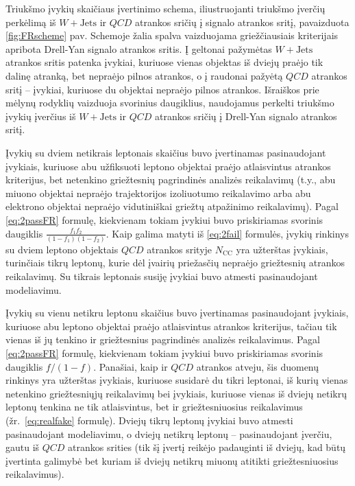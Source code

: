 \documentclass[a4paper, 12pt, oneside]{article}
\newcommand{\WJets}{W\! +\!\mathrm{Jets}}
\newcommand{\QCD}{QC\! D}
\newlength\q
\begin{document}
Triukšmo įvykių skaičiaus įvertinimo schema, iliustruojanti triukšmo įverčių perkėlimą iš $\WJets$ ir $\QCD$ atrankos sričių
į signalo atrankos sritį, pavaizduota \ref{fig:FRscheme} pav.
Schemoje žalia spalva vaizduojama griežčiausiais kriterijais apribota Drell-Yan signalo atrankos sritis.
Į geltonai pažymėtas $\WJets$ atrankos sritis patenka įvykiai, kuriuose vienas objektas iš dviejų praėjo tik dalinę atranką,
bet nepraėjo pilnos atrankos, o į raudonai pažyėtą $\QCD$ atrankos sritį -- įvykiai, kuriuose du objektai nepraėjo pilnos atrankos.
Išraiškos prie mėlynų rodyklių vaizduoja svorinius daugiklius, naudojamus perkelti triukšmo įvykių įverčius iš $\WJets$
ir $\QCD$ atrankos sričių į Drell-Yan signalo atrankos sritį.

Įvykių su dviem netikrais leptonais skaičius buvo įvertinamas pasinaudojant įvykiais, kuriuose abu užfiksuoti
leptono objektai praėjo atlaisvintus atrankos kriterijus, bet netenkino griežtesnių pagrindinės analizės reikalavimų (t.y., abu
miuono objektai nepraėjo trajektorijos izoliuotumo reikalavimo arba abu elektrono objektai nepraėjo vidutiniškai griežtų
atpažinimo reikalavimų).
Pagal \eqref{eq:2passFR} formulę, kiekvienam tokiam įvykiui buvo priskiriamas svorinis daugiklis $\frac{f_1 f_2}{(1-f_1)(1-f_2)}$.
Kaip galima matyti iš \eqref{eq:2fail} formulės, įvykių rinkinys su dviem leptono objektais $\QCD$ atrankos srityje $N_{\mathrm{CC}}$
yra užterštas įvykiais, turinčiais tikrų leptonų, kurie dėl įvairių priežasčių nepraėjo griežtesnių atrankos reikalavimų.
Su tikrais leptonais susiję įvykiai buvo atmesti pasinaudojant modeliavimu.

Įvykių su vienu netikru leptonu skaičius buvo įvertinamas pasinaudojant įvykiais, kuriuose abu leptono objektai
praėjo atlaisvintus atrankos kriterijus, tačiau tik vienas iš jų tenkino ir griežtesnius pagrindinės analizės reikalavimus.
Pagal \eqref{eq:2passFR} formulę, kiekvienam tokiam įvykiui buvo priskiriamas svorinis daugiklis $f/(1-f)$.
Panašiai, kaip ir $\QCD$ atrankos atveju, šis duomenų rinkinys yra užterštas įvykiais, kuriuose susidarė du tikri leptonai,
iš kurių vienas netenkino griežtesniųjų reikalavimų bei įvykiais, kuriuose vienas iš dviejų netikrų leptonų tenkina
ne tik atlaisvintus, bet ir griežtesniuosius reikalavimus (žr.\ \ref{eq:realfake} formulę).
Dviejų tikrų leptonų įvykiai buvo atmesti pasinaudojant modeliavimu, o dviejų netikrų leptonų -- pasinaudojant įverčiu, gautu
iš $\QCD$ atrankos srities (tik šį įvertį reikėjo padauginti iš dviejų, kad būtų įvertinta galimybė bet kuriam iš dviejų
netikrų miuonų atitikti griežtesniuosius reikalavimus).
\end{document}
